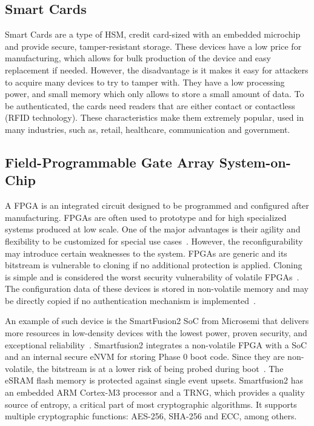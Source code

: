 \subsection*{Smart Cards}\label{chap:background:computing:smartcards}
Smart Cards are a type of \ac{HSM}, credit card-sized with an embedded microchip and provide secure, tamper-resistant storage. These devices have a low price for manufacturing, which allows for bulk production of the device and easy replacement if needed. However, the disadvantage is it makes it easy for attackers to acquire many devices to try to tamper with. They have a low processing power, and small memory which only allows to store a small amount of data. To be authenticated, the cards need readers that are either contact or contactless (RFID technology). These characteristics make them extremely popular, used in many industries, such as, retail, healthcare, communication and government.

\subsection{Field-Programmable Gate Array System-on-Chip}\label{chap:background:computing:smartfusion}
A \ac{FPGA} is an integrated circuit designed to be programmed and configured after manufacturing. \ac{FPGA}s are often used to prototype and for high specialized systems produced at low scale. One of the major advantages is their agility and flexibility to be customized for special use cases~\cite{cyberphysicalsystems}. However, the reconfigurability may introduce certain weaknesses to the system. \ac{FPGA}s are generic and its bitstream is vulnerable to cloning if no additional protection is applied. Cloning is simple and is considered the worst security vulnerability of volatile \ac{FPGA}s~\cite{fpgasurvey}. The configuration data of these devices is stored in non-volatile memory and may be directly copied if no authentication mechanism is implemented~\cite{drimer2007authentication}.

An example of such device is the SmartFusion2 \ac{SoC} from Microsemi that delivers more resources in low-density devices with the lowest power, proven security, and exceptional reliability~\cite{smartfusion2soc}. Smartfusion2 integrates a non-volatile \ac{FPGA} with a \ac{SoC} and an internal secure eNVM for storing Phase 0 boot code. Since they are non-volatile, the bitstream is at a lower risk of being probed during boot~\cite{parrinha2017flexible}. The eSRAM flash memory is protected against single event upsets. Smartfusion2 has an embedded ARM Cortex-M3 processor and a \ac{TRNG}, which provides a quality source of entropy, a critical part of most cryptographic algorithms. It supports multiple cryptographic functions: \ac{AES}-256, \ac{SHA}-256 and \ac{ECC}, among others.


